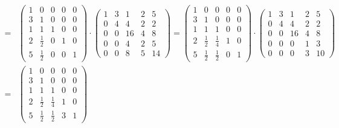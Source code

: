 \documentclass[]{book}
\theoremstyle{definition}
\begin{document}
\begin{enumerate}
\begin{enumerate}
\begin{align*}
            =
            &
            \begin{pmatrix}
                1 & 0 & 0 & 0 & 0 \\
                3 & 1 & 0 & 0 & 0 \\
                1 & 1 & 1 & 0 & 0 \\
                2 & \frac{1}{2} & 0 & 1 & 0 \\
                5 & \frac{1}{2} & 0 & 0 & 1 
            \end{pmatrix} 
            \cdot
            \begin{pmatrix}
                1 & 3 & 1 & 2 & 5 \\
                0 & 4 & 4 & 2 & 2 \\
                0 & 0 & 16 & 4 & 8 \\
                0 & 0 & 4 & 2 & 5 \\
                0 & 0 & 8 & 5 & 14 
            \end{pmatrix} 
            =
            \begin{pmatrix}
                1 & 0 & 0 & 0 & 0 \\
                3 & 1 & 0 & 0 & 0 \\
                1 & 1 & 1 & 0 & 0 \\
                2 & \frac{1}{2} & \frac{1}{4} & 1 & 0 \\
                5 & \frac{1}{2} & \frac{1}{2} & 0 & 1 
            \end{pmatrix} 
            \cdot
            \begin{pmatrix}
                1 & 3 & 1 & 2 & 5 \\
                0 & 4 & 4 & 2 & 2 \\
                0 & 0 & 16 & 4 & 8 \\
                0 & 0 & 0 & 1 & 3 \\
                0 & 0 & 0 & 3 & 10 
            \end{pmatrix} \\
            =
            &
            \begin{pmatrix}
                1 & 0 & 0 & 0 & 0 \\
                3 & 1 & 0 & 0 & 0 \\
                1 & 1 & 1 & 0 & 0 \\
                2 & \frac{1}{2} & \frac{1}{4} & 1 & 0 \\
                5 & \frac{1}{2} & \frac{1}{2} & 3 & 1 
            \end{pmatrix} 

\end{align*}
\end{enumerate}
\end{enumerate}
\end{document}
